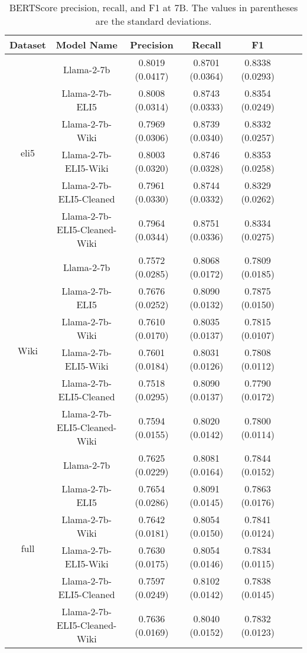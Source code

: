 \documentclass[11pt, oneside]{article}   	%
\begin{document}
\begin{table}[ht]
\centering
\begin{tabular}{ccccccc}
\toprule
Dataset & Model Name & Precision & Recall & F1 \\
\midrule
\multirow{6}{*}{eli5} & Llama-2-7b & 0.8019 (0.0417) & 0.8701 (0.0364) & 0.8338 (0.0293) \\
 & Llama-2-7b-ELI5 & 0.8008 (0.0314) & 0.8743 (0.0333) & 0.8354 (0.0249) \\
 & Llama-2-7b-Wiki & 0.7969 (0.0306) & 0.8739 (0.0340) & 0.8332 (0.0257) \\
 & Llama-2-7b-ELI5-Wiki & 0.8003 (0.0320) & 0.8746 (0.0328) & 0.8353 (0.0258) \\
 & Llama-2-7b-ELI5-Cleaned & 0.7961 (0.0330) & 0.8744 (0.0332) & 0.8329 (0.0262) \\
 & Llama-2-7b-ELI5-Cleaned-Wiki & 0.7964 (0.0344) & 0.8751 (0.0336) & 0.8334 (0.0275) \\
\midrule
\multirow{6}{*}{Wiki} & Llama-2-7b & 0.7572 (0.0285) & 0.8068 (0.0172) & 0.7809 (0.0185) \\
 & Llama-2-7b-ELI5 & 0.7676 (0.0252) & 0.8090 (0.0132) & 0.7875 (0.0150) \\
 & Llama-2-7b-Wiki & 0.7610 (0.0170) & 0.8035 (0.0137) & 0.7815 (0.0107) \\
 & Llama-2-7b-ELI5-Wiki & 0.7601 (0.0184) & 0.8031 (0.0126) & 0.7808 (0.0112) \\
 & Llama-2-7b-ELI5-Cleaned & 0.7518 (0.0295) & 0.8090 (0.0137) & 0.7790 (0.0172) \\
 & Llama-2-7b-ELI5-Cleaned-Wiki & 0.7594 (0.0155) & 0.8020 (0.0142) & 0.7800 (0.0114) \\
 \midrule
\multirow{6}{*}{full} & Llama-2-7b & 0.7625 (0.0229) & 0.8081 (0.0164) & 0.7844 (0.0152) \\
 & Llama-2-7b-ELI5 & 0.7654 (0.0286) & 0.8091 (0.0145) & 0.7863 (0.0176) \\
 & Llama-2-7b-Wiki & 0.7642 (0.0181) & 0.8054 (0.0150) & 0.7841 (0.0124) \\
 & Llama-2-7b-ELI5-Wiki & 0.7630 (0.0175) & 0.8054 (0.0146) & 0.7834 (0.0115) \\
  & Llama-2-7b-ELI5-Cleaned & 0.7597 (0.0249) & 0.8102 (0.0142) & 0.7838 (0.0145) \\
 & Llama-2-7b-ELI5-Cleaned-Wiki & 0.7636 (0.0169) & 0.8040 (0.0152) & 0.7832 (0.0123) \\
\bottomrule
\end{tabular}
\caption{BERTScore precision, recall, and F1 at 7B. The values in parentheses are the standard deviations.}
\label{tab:bertscores_7b}
\end{table}
\end{document}
